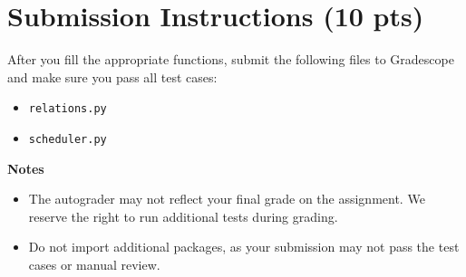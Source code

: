 \documentclass{article}
\begin{document}






\section*{Submission Instructions (10 pts)}
    After you fill the appropriate functions, submit the following files to Gradescope and make sure you pass all test cases:
    \begin{itemize}
        \item \lstinline{relations.py}
        \item \lstinline{scheduler.py}
    \end{itemize}

    \vspace{3mm}
    \textbf{Notes}

    \begin{itemize}
        \item The autograder may not reflect your final grade on the assignment. We reserve the right to run additional tests during grading.
        \item Do not import additional packages, as your submission may not pass the test cases or manual review.
    \end{itemize}

    
\end{document}
